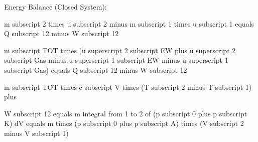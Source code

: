 Energy Balance (Closed System):  

m subscript 2 times u subscript 2 minus m subscript 1 times u subscript 1 equals Q subscript 12 minus W subscript 12  

m subscript TOT times (u superscript 2 subscript EW plus u superscript 2 subscript Gas minus u superscript 1 subscript EW minus u superscript 1 subscript Gas) equals Q subscript 12 minus W subscript 12  

m subscript TOT times c subscript V times (T subscript 2 minus T subscript 1) plus  

W subscript 12 equals m integral from 1 to 2 of (p subscript 0 plus p subscript K) dV equals m times (p subscript 0 plus p subscript A) times (V subscript 2 minus V subscript 1)